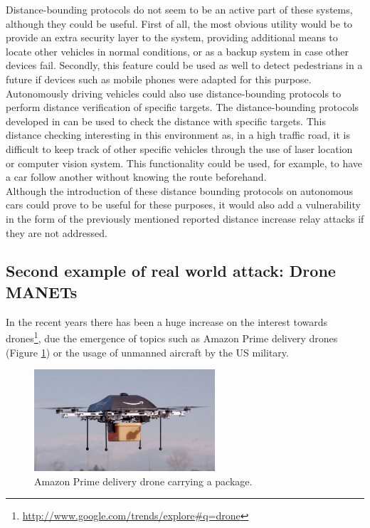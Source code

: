 \documentclass{article}
\begin{document}
Distance-bounding protocols do not seem to be an active part of these systems, although they could be useful. First of all, the most obvious utility would be to provide an extra security layer to the system, providing additional means to locate other vehicles in normal conditions, or as a backup system in case other devices fail. Secondly, this feature could be used as well to detect pedestrians in a future if devices such as mobile phones were adapted for this purpose.\\

Autonomously driving vehicles could also use distance-bounding protocols to perform distance verification of specific targets. The distance-bounding protocols developed in  \cite{capkun2006secure, rasmussen2010realization} can be used to check the distance with specific targets. This distance checking interesting in this environment as, in a high traffic road, it is difficult to keep track of other specific vehicles through the use of laser location or computer vision system. This functionality could be used, for example, to have a car follow another without knowing the route beforehand.\\

Although the introduction of these distance bounding protocols on autonomous cars could prove to be useful for these purposes, it would also add a vulnerability in the form of the previously mentioned reported distance increase relay attacks if they are not addressed.\\


\subsection{Second example of real world attack: Drone MANETs}

In the recent years there has been a huge increase on the interest towards drones\footnote{\url{http://www.google.com/trends/explore#q=drone}}, due the emergence of topics such as Amazon Prime delivery drones (Figure \ref{fig:amazondrone}) or the usage of unmanned aircraft by the US military.\\


\begin{figure}[h!]
  \centering
    \includegraphics[width=0.6\textwidth]{images/amazonprimedrone.png}
  \caption{Amazon Prime delivery drone carrying a package.}
  \label{fig:amazondrone}
\end{figure}
\end{document}
